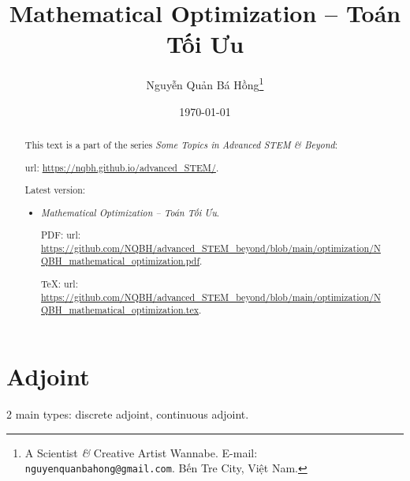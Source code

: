 \documentclass{article}
\title{Mathematical Optimization -- Toán Tối Ưu}
\author{Nguyễn Quản Bá Hồng\footnote{A Scientist {\it\&} Creative Artist Wannabe. E-mail: {\tt nguyenquanbahong@gmail.com}. Bến Tre City, Việt Nam.}}
\date{\today}
\begin{document}
\maketitle
\begin{abstract}
	This text is a part of the series {\it Some Topics in Advanced STEM \& Beyond}:
	
	{\sc url}: \url{https://nqbh.github.io/advanced_STEM/}.
	
	Latest version:
	\begin{itemize}
		\item {\it Mathematical Optimization -- Toán Tối Ưu}.
		
		PDF: {\sc url}: \url{https://github.com/NQBH/advanced_STEM_beyond/blob/main/optimization/NQBH_mathematical_optimization.pdf}.
		
		\TeX: {\sc url}: \url{https://github.com/NQBH/advanced_STEM_beyond/blob/main/optimization/NQBH_mathematical_optimization.tex}.
	\end{itemize}
\end{abstract}
\tableofcontents


\section{Adjoint}
2 main types: discrete adjoint, continuous adjoint.
\end{document}
